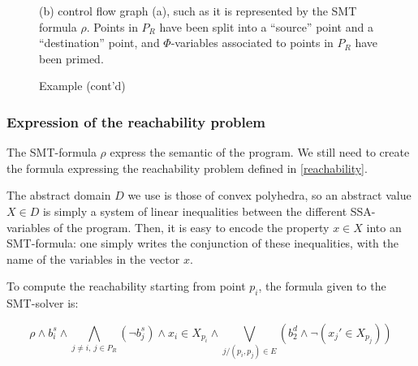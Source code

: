 \documentclass[a4paper,english,titlepage,11pt]{report}
\begin{document}
\begin{figure}[!h]
\begin{minipage}[c]{.49\linewidth}

(b) control flow graph (a), such as it is represented by the SMT formula $\rho$.
Points in $P_R$ have been split into a ``source'' point and a ``destination''
point, and $\Phi$-variables associated to points in $P_R$ have been primed.
\end{minipage} 
\caption{Example (cont'd)}
\label{multigraphGopan}
\end{figure}

	\subsubsection{Expression of the reachability problem}
	\label{smtformula}
	The SMT-formula $\rho$ express the semantic of the program. We still need to create the
	formula expressing the reachability problem defined in \ref{reachability}.

	The abstract domain $D$ we use is those of convex polyhedra, so an abstract
	value $X \in D$ is simply a system of linear inequalities between the
	different SSA-variables of the program. Then, it is easy to encode the
	property $x \in X$ into an SMT-formula: one simply writes the conjunction of
	these inequalities, with the name of the variables in the vector $x$.

	To compute the reachability starting from point $p_i$, the formula given to
	the SMT-solver is:

	$$\rho \wedge b_i^s \wedge \bigwedge_{j\neq i,\ j\in P_R} (\neg b_j^s)
	\wedge x_i \in X_{p_i} \wedge \bigvee_{j/(p_i,p_j)\in E} (b_2^d \wedge \neg
	(x_j' \in X_{p_j}))$$
\end{document}

